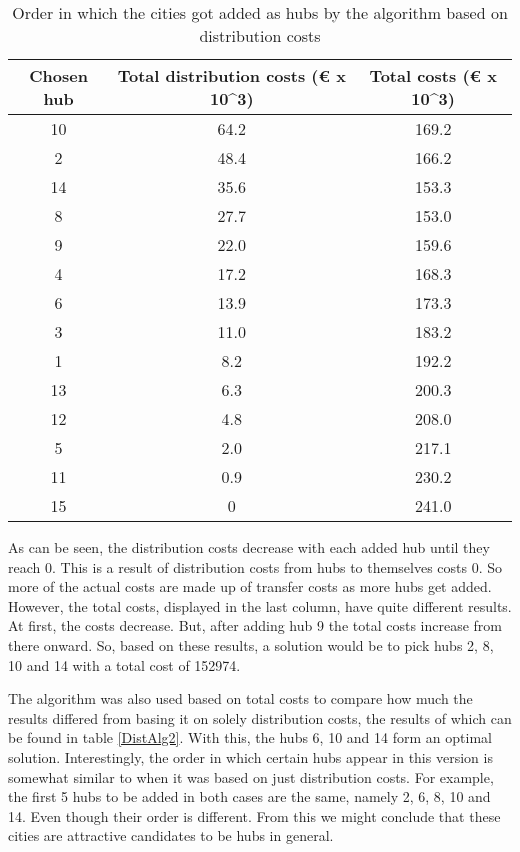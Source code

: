 \documentclass{article}
\begin{document}
\begin{table}[h]
\centering
\begin{tabular}{||c|c|c||}
\hline
    Chosen hub & Total distribution costs (€ x 10^3)& Total costs (€ x 10^3)  \\
\hline
\hline
    10 & 64.2 & 169.2 \\
    \hline
    2 & 48.4 & 166.2 \\
    \hline
    14 & 35.6 & 153.3 \\
    \hline
    8 & 27.7 & 153.0 \\
    \hline
    9 & 22.0 & 159.6 \\
    \hline
    4 & 17.2 & 168.3 \\
    \hline
    6 & 13.9 & 173.3 \\
    \hline
    3 & 11.0 & 183.2 \\
    \hline
    1 & 8.2 & 192.2 \\
    \hline
    13 & 6.3 & 200.3 \\
    \hline
    12 & 4.8 & 208.0 \\
    \hline
    5 & 2.0 & 217.1 \\
    \hline
    11 & 0.9 & 230.2 \\
    \hline
    15 & 0 & 241.0 \\
    \hline
\end{tabular}
\caption{\centering Order in which the cities got added as hubs by the algorithm based on distribution costs}
\label{DistAlg}
\end{table}

As can be seen, the distribution costs decrease with each added hub until they reach 0. This is a result of distribution costs from hubs to themselves costs 0. So more of the actual costs are made up of transfer costs as more hubs get added. However, the total costs, displayed in the last column, have quite different results. At first, the costs decrease. But, after adding hub 9 the total costs increase from there onward. So, based on these results, a solution would be to pick hubs 2, 8, 10 and 14 with a total cost of 152974.

The algorithm was also used based on total costs to compare how much the results differed from basing it on solely distribution costs, the results of which can be found in table \ref{DistAlg2}. With this, the hubs 6, 10 and 14 form an optimal solution. Interestingly, the order in which certain hubs appear in this version is somewhat similar to when it was based on just distribution costs. For example, the first 5 hubs to be added in both cases are the same, namely 2, 6, 8, 10 and 14. Even though their order is different. From this we might conclude that these cities are attractive candidates to be hubs in general.
\end{document}
